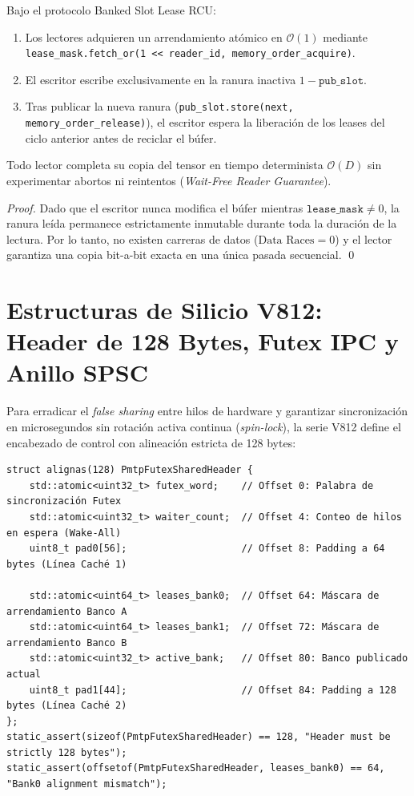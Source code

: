 \begin{theorem}

Bajo el protocolo Banked Slot Lease RCU:
\begin{enumerate}
    \item Los lectores adquieren un arrendamiento atómico en $\mathcal{O}(1)$ mediante \texttt{lease\_mask.fetch\_or(1 << reader\_id, memory\_order\_acquire)}.
    \item El escritor escribe exclusivamente en la ranura inactiva $1 - \texttt{pub\_slot}$.
    \item Tras publicar la nueva ranura (\texttt{pub\_slot.store(next, memory\_order\_release)}), el escritor espera la liberación de los leases del ciclo anterior antes de reciclar el búfer.
\end{enumerate}
Todo lector completa su copia del tensor en tiempo determinista $\mathcal{O}(D)$ sin experimentar abortos ni reintentos (\emph{Wait-Free Reader Guarantee}).
\end{theorem}

\begin{proof}
Dado que el escritor nunca modifica el búfer mientras $\texttt{lease\_mask} \neq 0$, la ranura leída permanece estrictamente inmutable durante toda la duración de la lectura. Por lo tanto, no existen carreras de datos ($\text{Data Races} = 0$) y el lector garantiza una copia bit-a-bit exacta en una única pasada secuencial. \qed
\end{proof}

\section{Estructuras de Silicio V812: Header de 128 Bytes, Futex IPC y Anillo SPSC}


Para erradicar el \emph{false sharing} entre hilos de hardware y garantizar sincronización en microsegundos sin rotación activa continua (\emph{spin-lock}), la serie V812 define el encabezado de control con alineación estricta de 128 bytes:

\begin{verbatim}
struct alignas(128) PmtpFutexSharedHeader {
    std::atomic<uint32_t> futex_word;    // Offset 0: Palabra de sincronización Futex
    std::atomic<uint32_t> waiter_count;  // Offset 4: Conteo de hilos en espera (Wake-All)
    uint8_t pad0[56];                    // Offset 8: Padding a 64 bytes (Línea Caché 1)
    
    std::atomic<uint64_t> leases_bank0;  // Offset 64: Máscara de arrendamiento Banco A
    std::atomic<uint64_t> leases_bank1;  // Offset 72: Máscara de arrendamiento Banco B
    std::atomic<uint32_t> active_bank;   // Offset 80: Banco publicado actual
    uint8_t pad1[44];                    // Offset 84: Padding a 128 bytes (Línea Caché 2)
};
static_assert(sizeof(PmtpFutexSharedHeader) == 128, "Header must be strictly 128 bytes");
static_assert(offsetof(PmtpFutexSharedHeader, leases_bank0) == 64, "Bank0 alignment mismatch");
\end{verbatim}

